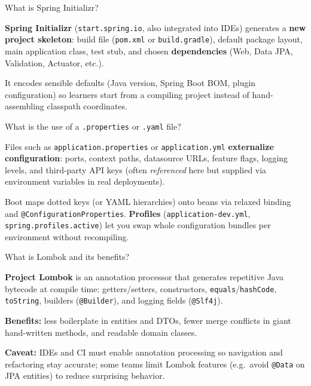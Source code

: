 \question[4]
What is Spring Initializr?
\begin{solutionorbox}[1.1in]
  \textbf{Spring Initializr} (\texttt{start.spring.io}, also integrated into IDEs) generates a \textbf{new project skeleton}: build file (\texttt{pom.xml} or \texttt{build.gradle}), default package layout, main application class, test stub, and chosen \textbf{dependencies} (Web, Data JPA, Validation, Actuator, etc.).

  It encodes sensible defaults (Java version, Spring Boot BOM, plugin configuration) so learners start from a compiling project instead of hand-assembling classpath coordinates.
\end{solutionorbox}

\question[4]
What is the use of a \texttt{.properties} or \texttt{.yaml} file?
\begin{solutionorbox}[1.35in]
  Files such as \texttt{application.properties} or \texttt{application.yml} \textbf{externalize configuration}: ports, context paths, datasource URLs, feature flags, logging levels, and third-party API keys (often \emph{referenced} here but supplied via environment variables in real deployments).

  Boot maps dotted keys (or YAML hierarchies) onto beans via relaxed binding and \texttt{@ConfigurationProperties}. \textbf{Profiles} (\texttt{application-dev.yml}, \texttt{spring.profiles.active}) let you swap whole configuration bundles per environment without recompiling.
\end{solutionorbox}

\newpage


\question[4]
What is Lombok and its benefits?
\begin{solutionorbox}[1.25in]
  \textbf{Project Lombok} is an annotation processor that generates repetitive Java bytecode at compile time: getters/setters, constructors, \texttt{equals}/\texttt{hashCode}, \texttt{toString}, builders (\texttt{@Builder}), and logging fields (\texttt{@Slf4j}).

  \noindent\textbf{Benefits:} less boilerplate in entities and DTOs, fewer merge conflicts in giant hand-written methods, and readable domain classes.

  \noindent\textbf{Caveat:} IDEs and CI must enable annotation processing so navigation and refactoring stay accurate; some teams limit Lombok features (e.g.\ avoid \texttt{@Data} on JPA entities) to reduce surprising behavior.
\end{solutionorbox}

